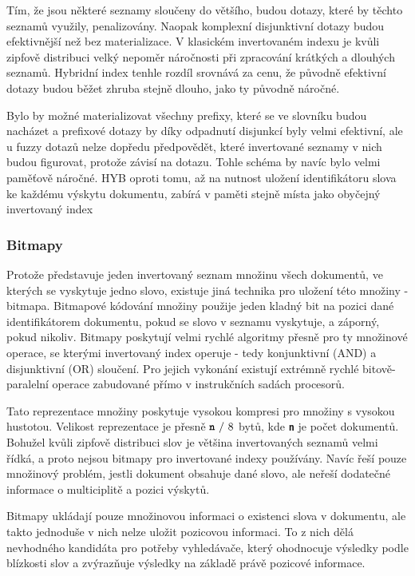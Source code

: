 \documentclass[11pt,letterpaper,oneside,openright]{book}
\newcommand{\bftt}[1]{\texttt{\textbf{#1}}}
\begin{document}
Tím, že jsou některé seznamy sloučeny do většího, budou dotazy, které by těchto
seznamů využily, penalizovány. Naopak komplexní disjunktivní dotazy budou
efektivnější než bez materializace. V klasickém invertovaném indexu je kvůli
zipfově distribuci velký nepoměr náročnosti při zpracování krátkých a dlouhých
seznamů. Hybridní index tenhle rozdíl srovnává za cenu, že původně efektivní
dotazy budou běžet zhruba stejně dlouho, jako ty původně náročné.

Bylo by možné materializovat všechny prefixy, které se ve slovníku budou
nacházet a prefixové dotazy by díky odpadnutí disjunkcí byly velmi efektivní,
ale u fuzzy dotazů nelze dopředu předpovědět, které invertované seznamy v nich
budou figurovat, protože závisí na dotazu. Tohle schéma by navíc bylo velmi
paměťově náročné. HYB oproti tomu, až na nutnost uložení identifikátoru slova
ke každému výskytu dokumentu, zabírá v paměti stejně místa jako obyčejný
invertovaný index

\subsubsection{Bitmapy}
Protože představuje jeden invertovaný seznam množinu všech dokumentů, ve
kterých se vyskytuje jedno slovo, existuje jiná technika pro uložení této
množiny - bitmapa. Bitmapové kódování množiny použije jeden kladný bit na
pozici dané identifikátorem dokumentu, pokud se slovo v seznamu vyskytuje, a
záporný, pokud nikoliv. Bitmapy poskytují velmi rychlé algoritmy přesně pro ty
množinové operace, se kterými invertovaný index operuje - tedy konjunktivní
(AND) a disjunktivní (OR) sloučení. Pro jejich vykonání existují extrémně
rychlé bitově-paralelní operace zabudované přímo v instrukčních sadách
procesorů.

Tato reprezentace množiny poskytuje vysokou kompresi pro množiny s vysokou
hustotou. Velikost reprezentace je přesně $\bftt{n}\ /\ 8$ bytů, kde \bftt{n}
je počet dokumentů. Bohužel kvůli zipfově distribuci slov je většina
invertovaných seznamů velmi řídká, a proto nejsou bitmapy pro invertované
indexy používány. Navíc řeší pouze množinový problém, jestli dokument obsahuje
dané slovo, ale neřeší dodatečné informace o multiciplitě a pozici výskytů.

Bitmapy ukládají pouze množinovou informaci o existenci slova v dokumentu, ale
takto jednoduše v nich nelze uložit pozicovou informaci. To z nich dělá
nevhodného kandidáta pro potřeby vyhledávače, který ohodnocuje výsledky podle
blízkosti slov a zvýrazňuje výsledky na základě právě pozicové informace.
\end{document}
